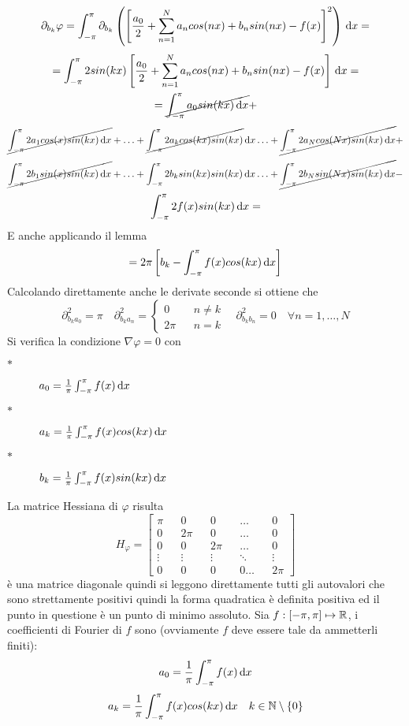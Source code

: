 \[\partial_{b_k}\varphi = \int_{-\pi}^{\pi}\partial_{b_k}\left(\left[\frac{a_0}{2}+\sum\limits_{n=1}^{N}a_{n}cos(nx)+b_{n}sin(nx)-f(x)\right]^2\right)\,\mathrm{d}{x}=\]
\[ = \int_{-\pi}^{\pi} 2sin(kx) \left[\frac{a_0}{2}+\sum\limits_{n=1}^{N}a_{n}cos(nx)+b_{n}sin(nx)-f(x)\right]\,\mathrm{d}{x}=\]
\[ =  \cancel{\int_{-\pi}^{\pi} a_0sin(kx)\,\mathrm{d}{x}} + \]
\[\cancel{\int_{-\pi}^{\pi} 2a_1cos(x)sin(kx)\,\mathrm{d}{x}} +
\ldots +
\cancel{\int_{-\pi}^{\pi} 2a_kcos(kx)sin(kx)}\,\mathrm{d}{x}
\ldots +
\cancel{\int_{-\pi}^{\pi} 2a_Ncos(Nx)sin(kx)\,\mathrm{d}{x}} + \]
\[\cancel{\int_{-\pi}^{\pi} 2b_1sin(x)sin(kx)\,\mathrm{d}{x}} +
\ldots +
\int_{-\pi}^{\pi} 2b_ksin(kx)sin(kx)\,\mathrm{d}{x}
\ldots +
\cancel{\int_{-\pi}^{\pi} 2b_Nsin(Nx)sin(kx)\,\mathrm{d}{x}} - \]
\[\int_{-\pi}^{\pi} 2f(x)sin(kx)\,\mathrm{d}{x} = \]
E anche applicando il lemma
\[=2\pi\left[b_k-\int_{-\pi}^{\pi}f(x)cos(kx)\,\mathrm{d}{x}\right]\]
Calcolando direttamente anche le derivate seconde si ottiene che
\[\partial^2_{b_ka_0}=\pi\quad\partial^2_{b_ka_n}=
\left\{\begin{matrix}
0&&n\ne k\\2\pi&&n=k
\end{matrix}\right.
\quad\partial^2_{b_kb_n}=0\quad\forall n=1,\dotsc,N\]
Si verifica la condizione $\nabla\varphi = 0$ con
\begin{description}
	\item[$\ast$] $a_0=\frac{1}{\pi}\int_{-\pi}^{\pi}f(x)\,\mathrm{d}{x}$
	\item[$\ast$] $a_k=\frac{1}{\pi}\int_{-\pi}^{\pi}f(x)cos(kx)\,\mathrm{d}{x}$
	\item[$\ast$] $b_k=\frac{1}{\pi}\int_{-\pi}^{\pi}f(x)sin(kx)\,\mathrm{d}{x}$
\end{description}
La matrice Hessiana di $\varphi$ risulta \[H_{\varphi}=\left[\begin{matrix}
\pi&&0&&0&&\ldots&&0\\
0&&2\pi&&0&&\ldots&&0\\
0&&0&&2\pi&&\ldots&&0\\
\vdots&&\vdots&&\vdots&&\ddots&&\vdots\\
0&&0&&0&&0\ldots&&2\pi
\end{matrix}\right]\]
è una matrice diagonale quindi si leggono direttamente tutti gli autovalori che sono strettamente positivi quindi la forma quadratica è definita positiva ed il punto in questione è un punto di minimo assoluto.
Sia $f: \left[-\pi,\pi\right] \mapsto \mathbb{R}$, i coefficienti di Fourier di $f$ sono (ovviamente $f$ deve essere tale da ammetterli finiti):
\[a_0=\frac{1}{\pi}\int_{-\pi}^{\pi}f(x)\,\mathrm{d}{x}\]
\[a_k=\frac{1}{\pi}\int_{-\pi}^{\pi}f(x)cos(kx)\,\mathrm{d}{x}\quad k\in\mathbb{N}\setminus{\left\{0\right\}}\]
